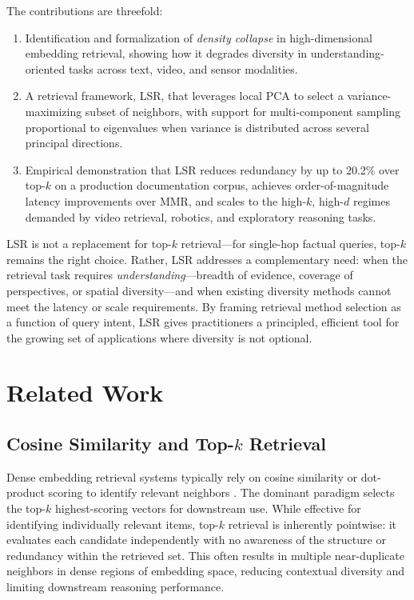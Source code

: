 \documentclass{article}
\begin{document}
The contributions are threefold:
\begin{enumerate}
    \item Identification and formalization of \emph{density collapse} in high-dimensional embedding retrieval, showing how it degrades diversity in understanding-oriented tasks across text, video, and sensor modalities.
    \item A retrieval framework, LSR, that leverages local PCA to select a variance-maximizing subset of neighbors, with support for multi-component sampling proportional to eigenvalues when variance is distributed across several principal directions.
    \item Empirical demonstration that LSR reduces redundancy by up to 20.2\% over top-$k$ on a production documentation corpus, achieves order-of-magnitude latency improvements over MMR, and scales to the high-$k$, high-$d$ regimes demanded by video retrieval, robotics, and exploratory reasoning tasks.
\end{enumerate}

LSR is not a replacement for top-$k$ retrieval---for single-hop factual queries, top-$k$ remains the right choice. Rather, LSR addresses a complementary need: when the retrieval task requires \emph{understanding}---breadth of evidence, coverage of perspectives, or spatial diversity---and when existing diversity methods cannot meet the latency or scale requirements. By framing retrieval method selection as a function of query intent, LSR gives practitioners a principled, efficient tool for the growing set of applications where diversity is not optional.

\section{Related Work}

\subsection{Cosine Similarity and Top-$k$ Retrieval}
Dense embedding retrieval systems typically rely on cosine similarity or dot-product scoring to identify relevant neighbors \cite{johnson2019billion, karpukhin2020dense}. The dominant paradigm selects the top-$k$ highest-scoring vectors for downstream use. While effective for identifying individually relevant items, top-$k$ retrieval is inherently pointwise: it evaluates each candidate independently with no awareness of the structure or redundancy within the retrieved set. This often results in multiple near-duplicate neighbors in dense regions of embedding space, reducing contextual diversity and limiting downstream reasoning performance.
\end{document}
